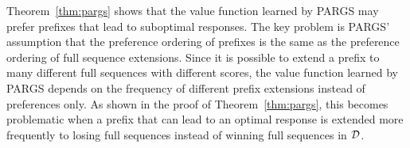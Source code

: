 Theorem~\ref{thm:pargs} shows that the value function learned by PARGS may prefer prefixes that lead to suboptimal responses.  The key problem is PARGS' assumption that the preference ordering of prefixes is the same as the preference ordering of full sequence extensions.  Since it is possible to extend a prefix to many different full sequences with different scores, the value function learned by PARGS depends on the frequency of different prefix extensions instead of preferences only.  As shown in the proof of Theorem~\ref{thm:pargs}, this becomes problematic when a prefix that can lead to an optimal response is extended more frequently to losing full sequences instead of winning full sequences in $\mathcal{D}$.

  
  
%

